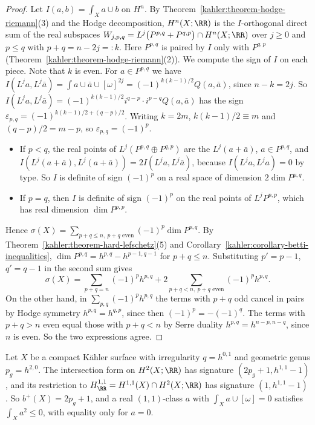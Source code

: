 \begin{proof}
Let $I(a, b) = \int_Xa \cup b$ on $H^n$. By Theorem~\ref{kahler:theorem-hodge-riemann}(3) and the Hodge decomposition, $H^n(X; \RR)$
is the $I$-orthogonal direct sum of the real subspaces $W_{j,p,q} = L^j\big(P^{p,q} + P^{q,p}\big) \cap H^n(X; \RR)$ over $j \geq 0$ and
$p \leq q$ with $p + q = n - 2j =: k$. Here $P^{p,q}$ is paired by $I$ only with $P^{q,p}$ (Theorem~\ref{kahler:theorem-hodge-riemann}(2)).
We compute the sign of $I$ on each piece. Note that $k$ is even. For $a \in P^{p,q}$ we have
$I(L^ja, L^j\bar a) = \int a \cup \bar a \cup [\omega]^{2j} = (-1)^{k(k-1)/2}Q(a, \bar a)$, since $n - k = 2j$. So
$I(L^ja, L^j\bar a) = (-1)^{k(k-1)/2}i^{q-p}\cdot i^{p-q}Q(a, \bar a)$ has the sign $\varepsilon_{p,q} = (-1)^{k(k-1)/2 + (q-p)/2}$. Writing $k = 2m$,
$k(k-1)/2 \equiv m$ and $(q - p)/2 = m - p$, so $\varepsilon_{p,q} = (-1)^p$.
\begin{itemize}
\item If $p < q$, the real points of $L^j(P^{p,q} \oplus P^{q,p})$ are the $L^j(a + \bar a)$, $a \in P^{p,q}$, and
$I(L^j(a + \bar a), L^j(a + \bar a)) = 2I(L^ja, L^j\bar a)$, because $I(L^ja, L^ja) = 0$ by type. So $I$ is definite of sign $(-1)^p$ on a
real space of dimension $2\dim P^{p,q}$.
\item If $p = q$, then $I$ is definite of sign $(-1)^p$ on the real points of $L^jP^{p,p}$, which has real dimension $\dim P^{p,p}$.
\end{itemize}
Hence $\sigma(X) = \sum_{p+q \leq n,\ p+q \text{ even}}(-1)^p\dim P^{p,q}$. By
Theorem~\ref{kahler:theorem-hard-lefschetz}(5) and Corollary~\ref{kahler:corollary-betti-inequalities},
$\dim P^{p,q} = h^{p,q} - h^{p-1,q-1}$ for $p + q \leq n$. Substituting $p' = p - 1$, $q' = q - 1$ in the second sum gives
\[
\sigma(X) = \sum_{p+q = n}(-1)^ph^{p,q} + 2\sum_{p+q < n,\ p+q \text{ even}}(-1)^ph^{p,q} .
\]
On the other hand, in $\sum_{p,q}(-1)^ph^{p,q}$ the terms with $p + q$ odd cancel in pairs by Hodge symmetry $h^{p,q} = h^{q,p}$, since then
$(-1)^p = -(-1)^q$. The terms with $p + q > n$ even equal those with $p + q < n$ by Serre duality $h^{p,q} = h^{n-p,n-q}$, since $n$ is
even. So the two expressions agree.
\end{proof}

\begin{corollary}\label{kahler:corollary-surfaces}
Let $X$ be a compact K\"ahler surface with irregularity $q = h^{0,1}$ and geometric genus $p_g = h^{2,0}$. The intersection form on
$H^2(X; \RR)$ has signature $(2p_g + 1, h^{1,1} - 1)$, and its restriction to $H^{1,1}_\RR = H^{1,1}(X) \cap H^2(X; \RR)$ has signature
$(1, h^{1,1} - 1)$. So $b^+(X) = 2p_g + 1$, and a real $(1,1)$-class $a$ with $\int_Xa \cup [\omega] = 0$ satisfies $\int_Xa^2 \leq 0$, with
equality only for $a = 0$.
\end{corollary}

